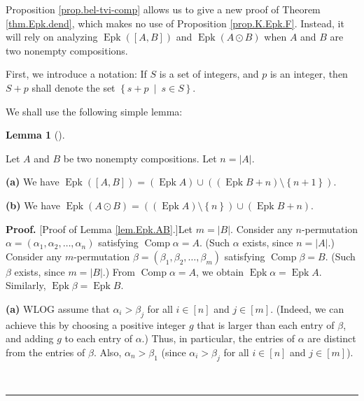 \documentclass[numbers=enddot,12pt,final,onecolumn,notitlepage]{scrartcl}%
\theoremstyle{definition}
\newtheorem{lem}[theo]{Lemma}
\newenvironment{lemma}[1][]
{\begin{lem}[#1]\begin{leftbar}}
{\end{leftbar}\end{lem}}
\newenvironment{proof}[1][Proof]{\noindent\textbf{#1.} }{\ \rule{0.5em}{0.5em}}
\newenvironment{verlong}{}{}
\begin{document}
\begin{verlong}
Proposition \ref{prop.bel-tvi-comp} allows us to give a new proof of Theorem
\ref{thm.Epk.dend}, which makes no use of Proposition \ref{prop.K.Epk.F}.
Instead, it will rely on analyzing $\operatorname{Epk}\left(  \left[
A,B\right]  \right)  $ and $\operatorname{Epk}\left(  A\odot B\right)  $ when
$A$ and $B$ are two nonempty compositions.

First, we introduce a notation: If $S$ is a set of integers, and $p$ is an
integer, then $S+p$ shall denote the set $\left\{  s+p\ \mid\ s\in S\right\}
$.

We shall use the following simple lemma:

\begin{lemma}
\label{lem.Epk.AB}Let $A$ and $B$ be two nonempty compositions. Let
$n=\left\vert A\right\vert $.

\textbf{(a)} We have $\operatorname{Epk}\left(  \left[  A,B\right]  \right)
=\left(  \operatorname{Epk}A\right)  \cup\left(  \left(  \operatorname{Epk}%
B+n\right)  \setminus\left\{  n+1\right\}  \right)  $.

\textbf{(b)} We have $\operatorname{Epk}\left(  A\odot B\right)  =\left(
\left(  \operatorname{Epk}A\right)  \setminus\left\{  n\right\}  \right)
\cup\left(  \operatorname{Epk}B+n\right)  $.
\end{lemma}

\begin{proof}
[Proof of Lemma \ref{lem.Epk.AB}.]Let $m=\left\vert B\right\vert $. Consider
any $n$-permutation $\alpha=\left(  \alpha_{1},\alpha_{2},\ldots,\alpha
_{n}\right)  $ satisfying $\operatorname*{Comp}\alpha=A$. (Such $\alpha$
exists, since $n=\left\vert A\right\vert $.) Consider any $m$-permutation
$\beta=\left(  \beta_{1},\beta_{2},\ldots,\beta_{m}\right)  $ satisfying
$\operatorname*{Comp}\beta=B$. (Such $\beta$ exists, since $m=\left\vert
B\right\vert $.) From $\operatorname*{Comp}\alpha=A$, we obtain
$\operatorname{Epk}\alpha=\operatorname{Epk}A$. Similarly,
$\operatorname{Epk}\beta=\operatorname{Epk}B$.

\textbf{(a)} WLOG assume that $\alpha_{i}>\beta_{j}$ for all $i\in\left[
n\right]  $ and $j\in\left[  m\right]  $. (Indeed, we can achieve this by
choosing a positive integer $g$ that is larger than each entry of $\beta$, and
adding $g$ to each entry of $\alpha$.) Thus, in particular, the entries of
$\alpha$ are distinct from the entries of $\beta$. Also, $\alpha_{n}>\beta
_{1}$ (since $\alpha_{i}>\beta_{j}$ for all $i\in\left[  n\right]  $ and
$j\in\left[  m\right]  $).


\end{proof}
\end{verlong}
\end{document}
